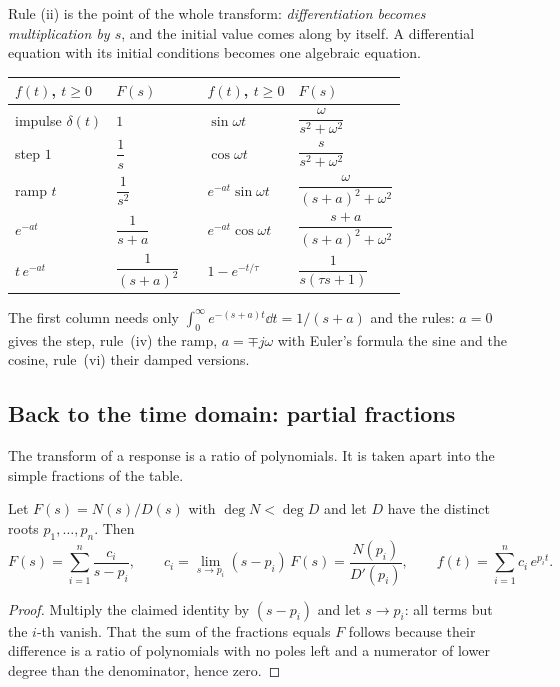 Rule (ii) is the point of the whole transform: \emph{differentiation becomes multiplication by $s$}, and the initial value comes along by itself. A differential equation with its initial conditions becomes one algebraic equation.

\begin{result}
\begin{center}\small
\renewcommand{\arraystretch}{1.5}
\begin{tabular}{@{}llcll@{}}
\toprule
$f(t)$, $t \ge 0$ & $F(s)$ & \qquad & $f(t)$, $t \ge 0$ & $F(s)$\\
\midrule
impulse $\delta(t)$ & $1$ & & $\sin\omega t$ & $\dfrac{\omega}{s^2 + \omega^2}$\\
step $1$ & $\dfrac1s$ & & $\cos\omega t$ & $\dfrac{s}{s^2 + \omega^2}$\\
ramp $t$ & $\dfrac{1}{s^2}$ & & $e^{-at}\sin\omega t$ & $\dfrac{\omega}{(s + a)^2 + \omega^2}$\\
$e^{-at}$ & $\dfrac{1}{s + a}$ & & $e^{-at}\cos\omega t$ & $\dfrac{s + a}{(s + a)^2 + \omega^2}$\\
$t\,e^{-at}$ & $\dfrac{1}{(s + a)^2}$ & & $1 - e^{-t/\tau}$ & $\dfrac{1}{s(\tau s + 1)}$\\
\bottomrule
\end{tabular}
\end{center}
\end{result}

The first column needs only $\int_0^\infty e^{-(s + a)t}\dd t = 1/(s + a)$ and the rules: $a = 0$ gives the step, rule~(iv) the ramp, $a = \mp j\omega$ with Euler's formula the sine and the cosine, rule~(vi) their damped versions.

\subsection{Back to the time domain: partial fractions}
The transform of a response is a ratio of polynomials. It is taken apart into the simple fractions of the table.

\begin{theorem}
\label{thm:C-pf}
Let $F(s) = N(s)/D(s)$ with $\deg N < \deg D$ and let $D$ have the distinct roots $p_1, \dots, p_n$. Then
\begin{equation*}
  F(s) = \sum_{i=1}^n \frac{c_i}{s - p_i}, \qquad c_i = \lim_{s \to p_i}(s - p_i)\,F(s) = \frac{N(p_i)}{D'(p_i)}, \qquad f(t) = \sum_{i=1}^n c_i\,e^{p_it} .
\end{equation*}
\end{theorem}
\begin{proof}
Multiply the claimed identity by $(s - p_i)$ and let $s \to p_i$: all terms but the $i$-th vanish. That the sum of the fractions equals $F$ follows because their difference is a ratio of polynomials with no poles left and a numerator of lower degree than the denominator, hence zero.
\end{proof}

